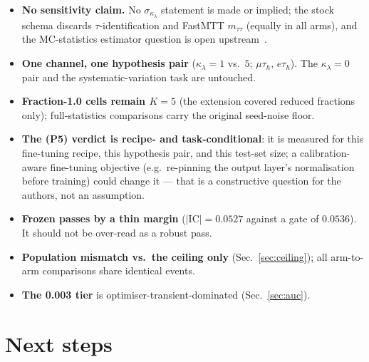 \documentclass[11pt]{article}
\newcommand{\kl}{\ensuremath{\kappa_\lambda}}
\newcommand{\IC}{\ensuremath{\mathrm{IC}}}
\begin{document}
\begin{itemize}[leftmargin=2.2em]
\item \textbf{No sensitivity claim.} No $\sigma_{\kl}$ statement is made or implied; the
  stock schema discards $\tau$-identification and FastMTT $m_{\tau\tau}$ (equally in all
  arms), and the MC-statistics estimator question is open
  upstream~\cite{Shyamsundar:2025}.
\item \textbf{One channel, one hypothesis pair} (\kl$=1$ vs.\ $5$; $\mu\tau_h$, $e\tau_h$).
  The \kl$=0$ pair and the systematic-variation task are untouched.
\item \textbf{Fraction-1.0 cells remain $K{=}5$} (the extension covered reduced
  fractions only); full-statistics comparisons carry the original seed-noise floor.
\item \textbf{The (P5) verdict is recipe- and task-conditional}: it is measured for this
  fine-tuning recipe, this hypothesis pair, and this test-set size; a calibration-aware
  fine-tuning objective (e.g.\ re-pinning the output layer's normalisation before
  training) could change it --- that is a constructive question for the authors, not an
  assumption.
\item \textbf{Frozen passes by a thin margin} ($|\IC| = 0.0527$ against a gate of $0.0536$).
  It should not be over-read as a robust pass.
\item \textbf{Population mismatch vs.\ the ceiling only} (Sec.~\ref{sec:ceiling}); all
  arm-to-arm comparisons share identical events.
\item \textbf{The 0.003 tier} is optimiser-transient-dominated (Sec.~\ref{sec:auc}).
\end{itemize}

\section{Next steps}
\label{sec:next}
\end{document}
